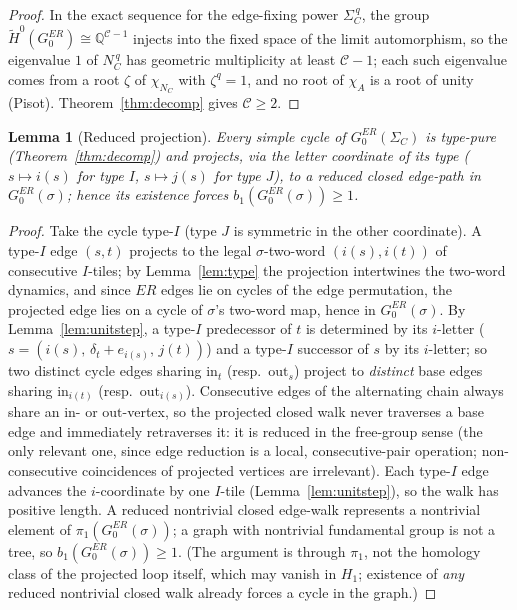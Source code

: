 \documentclass[11pt]{article}
\newtheorem{lemma}[theorem]{Lemma}
\begin{document}
\begin{proof}
In the exact sequence for the edge-fixing power $\Sigma_C^{\,q}$, the
group $\widetilde H^0(G_0^{ER})\cong\mathbb Q^{\mathcal C-1}$ injects
into the fixed space of the limit automorphism, so the eigenvalue $1$
of $N_C^{\,q}$ has geometric multiplicity at least $\mathcal C-1$;
each such eigenvalue comes from a root $\zeta$ of $\chi_{N_C}$ with
$\zeta^q=1$, and no root of $\chi_A$ is a root of unity (Pisot).
Theorem~\ref{thm:decomp} gives $\mathcal C\ge2$.
\end{proof}

\begin{lemma}[Reduced projection]\label{lem:redproj}
Every simple cycle of $G_0^{ER}(\Sigma_C)$ is type-pure
(Theorem~\ref{thm:decomp}) and projects, via the letter coordinate of
its type ($s\mapsto i(s)$ for type $I$, $s\mapsto j(s)$ for type $J$),
to a \emph{reduced} closed edge-path in $G_0^{ER}(\sigma)$; hence its
existence forces $b_1(G_0^{ER}(\sigma))\ge1$.
\end{lemma}

\begin{proof}
Take the cycle type-$I$ (type $J$ is symmetric in the other
coordinate). A type-$I$ edge $(s,t)$ projects to the legal
$\sigma$-two-word $(i(s),i(t))$ of consecutive $I$-tiles; by
Lemma~\ref{lem:type} the projection intertwines the two-word
dynamics, and since $ER$ edges lie on cycles of the edge permutation,
the projected edge lies on a cycle of $\sigma$'s two-word map, hence
in $G_0^{ER}(\sigma)$. By Lemma~\ref{lem:unitstep}, a type-$I$
predecessor of $t$ is determined by its $i$-letter
($s=(i(s),\,\delta_t+e_{i(s)},\,j(t))$) and a type-$I$ successor of
$s$ by its $i$-letter; so two distinct cycle edges sharing
$\mathrm{in}_t$ (resp.\ $\mathrm{out}_s$) project to \emph{distinct}
base edges sharing $\mathrm{in}_{i(t)}$ (resp.\
$\mathrm{out}_{i(s)}$). Consecutive edges of the alternating chain
always share an $\mathrm{in}$- or $\mathrm{out}$-vertex, so the
projected closed walk never traverses a base edge and immediately
retraverses it: it is reduced in the free-group sense (the only
relevant one, since edge reduction is a local, consecutive-pair
operation; non-consecutive coincidences of projected vertices are
irrelevant). Each type-$I$ edge advances the $i$-coordinate by one
$I$-tile (Lemma~\ref{lem:unitstep}), so the walk has positive length.
A reduced nontrivial closed edge-walk represents a nontrivial element
of $\pi_1(G_0^{ER}(\sigma))$; a graph with nontrivial fundamental
group is not a tree, so $b_1(G_0^{ER}(\sigma))\ge1$. (The argument is
through $\pi_1$, not the homology class of the projected loop itself,
which may vanish in $H_1$; existence of \emph{any} reduced nontrivial
closed walk already forces a cycle in the graph.)
\end{proof}
\end{document}
